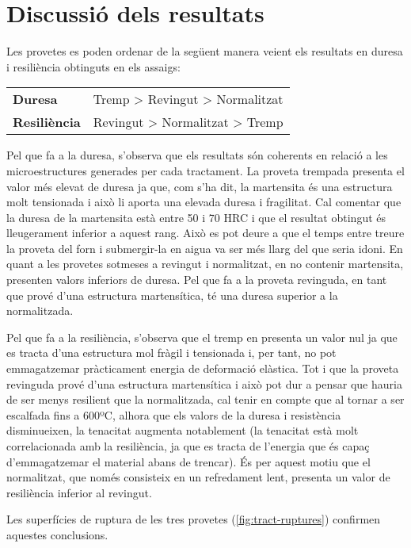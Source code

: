 \documentclass[a4paper]{report}
\begin{document}
\section{Discussió dels resultats}
Les provetes es poden ordenar de la següent manera veient els resultats en duresa i resiliència obtinguts en els assaigs:

\begin{table}[H]
	\centering
	\begin{tabular}{lr}
		\textbf{Duresa} & Tremp > Revingut > Normalitzat \\
		\textbf{Resiliència} & Revingut > Normalitzat > Tremp
	\end{tabular}
\end{table}

Pel que fa a la duresa, s’observa que els resultats són coherents en relació a les microestructures generades per cada tractament. La proveta trempada presenta el valor més elevat de duresa ja que, com s’ha dit, la martensita és una estructura molt tensionada i això li aporta una elevada duresa i fragilitat. Cal comentar que la duresa de la martensita està entre 50 i 70 HRC i que el resultat obtingut és lleugerament inferior a aquest rang. Això es pot deure a que el temps entre treure la proveta del forn i submergir-la en aigua va ser més llarg del que seria idoni. En quant a les provetes sotmeses a revingut i normalitzat, en no contenir martensita, presenten valors inferiors de duresa. Pel que fa a la proveta revinguda, en tant que prové d’una estructura martensítica, té una duresa superior a la normalitzada.

Pel que fa a la resiliència, s’observa que el tremp en presenta un valor nul ja que es tracta d’una estructura mol fràgil i tensionada i, per tant, no pot emmagatzemar pràcticament energia de deformació elàstica. Tot i que la proveta revinguda prové d’una estructura martensítica i això pot dur a pensar que hauria de ser menys resilient que la normalitzada, cal tenir en compte que al tornar a ser escalfada fins a 600ºC, alhora que els valors de la duresa i resistència disminueixen, la tenacitat augmenta notablement (la tenacitat està molt correlacionada amb la resiliència, ja que es tracta de l’energia que és capaç d’emmagatzemar el material abans de trencar). És per aquest motiu que el normalitzat, que només consisteix en un refredament lent, presenta un valor de resiliència inferior al revingut.

Les superfícies de ruptura de les tres provetes (\autoref{fig:tract-ruptures}) confirmen aquestes conclusions.
\end{document}
